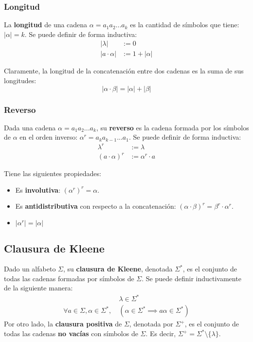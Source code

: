 \subsubsection{Longitud}

La \textbf{longitud} de una cadena $\alpha = a_1 a_2 ... a_k$ es la cantidad de símbolos que tiene: $|\alpha| = k$. Se puede definir de forma inductiva:
$$
\begin{aligned}
    |\lambda| & := 0 \\
    |a \cdot \alpha| & := 1 + |\alpha|
\end{aligned}
$$

Claramente, la longitud de la concatenación entre dos cadenas es la suma de sus longitudes:
$$|\alpha \cdot \beta| = |\alpha| + |\beta|$$

\subsubsection{Reverso}

Dada una cadena $\alpha = a_1 a_2 ... a_k$, su \textbf{reverso} es la cadena formada por los símbolos de $\alpha$ en el orden inverso: $\alpha^r = a_k a_{k-1} ... a_1$. Se puede definir de forma inductiva:
$$
\begin{aligned}
    \lambda^r & := \lambda \\
    (a \cdot \alpha)^r & := \alpha^r \cdot a
\end{aligned}
$$

Tiene las siguientes propiedades:
\begin{itemize}
    \item Es \textbf{involutiva}: $(\alpha^r)^r = \alpha$.
    \item Es \textbf{antidistributiva} con respecto a la concatenación: $(\alpha \cdot \beta)^r = \beta^r \cdot \alpha^r$.
    \item $|\alpha^r| = |\alpha|$
\end{itemize}

\subsection{Clausura de Kleene}

Dado un alfabeto $\Sigma$, su \textbf{clausura de Kleene}, denotada $\Sigma^*$, es el conjunto de todas las cadenas formadas por símbolos de $\Sigma$. Se puede definir inductivamente de la siguiente manera:
$$
\begin{aligned}
    & \lambda \in \Sigma^* \\
    \forall a \in \Sigma, \alpha \in \Sigma^*,\ & (\alpha \in \Sigma^* \implies a \alpha \in \Sigma^*)
\end{aligned}
$$
Por otro lado, la \textbf{clausura positiva} de $\Sigma$, denotada por $\Sigma^+$, es el conjunto de todas las cadenas \textbf{no vacías} con símbolos de $\Sigma$. Es decir, $\Sigma^+ = \Sigma^* \setminus \{\lambda\}$.

